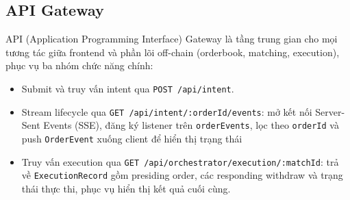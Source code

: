 
\subsection{API Gateway}
\label{sec:api-gateway}

API (Application Programming Interface) Gateway là tầng trung gian cho mọi
tương tác giữa frontend và phần lõi off-chain (orderbook, matching, execution),
phục vụ ba nhóm chức năng chính:
\begin{itemize}
  \item Submit và truy vấn intent qua \texttt{POST /api/intent}.
  \item Stream lifecycle qua \texttt{GET /api/intent/:orderId/events}:
    mở kết nối Server-Sent Events (SSE), đăng ký listener trên
    \texttt{orderEvents}, lọc theo \texttt{orderId} và push
    \texttt{OrderEvent} xuống client để hiển thị trạng thái
  \item Truy vấn execution qua
    \texttt{GET /api/orchestrator/execution/:matchId}: trả về
    \texttt{ExecutionRecord} gồm presiding order, các responding withdraw và
    trạng thái thực thi, phục vụ hiển thị kết quả cuối cùng.
\end{itemize}
